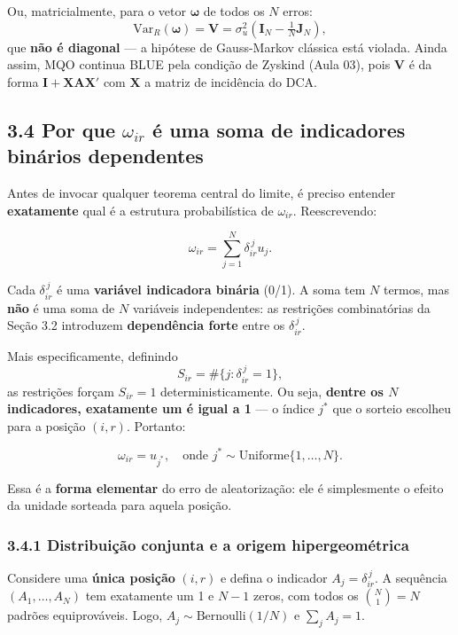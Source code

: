 \documentclass[
]{article}
\begin{document}
Ou, matricialmente, para o vetor \(\symbf{\omega}\) de todos os \(N\)
erros:
\[\mathrm{Var}_R(\symbf{\omega}) = \symbf{V} = \sigma_u^2\left(\symbf{I}_N - \tfrac{1}{N}\symbf{J}_N\right),\]
que \textbf{não é diagonal} --- a hipótese de Gauss-Markov clássica está
violada. Ainda assim, MQO continua BLUE pela condição de Zyskind (Aula
03), pois \(\symbf{V}\) é da forma
\(\symbf{I} + \symbf{X} \symbf{A} \symbf{X}'\) com \(\symbf{X}\) a
matriz de incidência do DCA.

\subsection{\texorpdfstring{3.4 Por que \(\omega_{ir}\) é uma soma de
indicadores binários
dependentes}{3.4 Por que \textbackslash omega\_\{ir\} é uma soma de indicadores binários dependentes}}\label{por-que-omega_ir-uxe9-uma-soma-de-indicadores-binuxe1rios-dependentes}

Antes de invocar qualquer teorema central do limite, é preciso entender
\textbf{exatamente} qual é a estrutura probabilística de
\(\omega_{ir}\). Reescrevendo:

\[\omega_{ir} = \sum_{j=1}^{N} \delta_{ir}^{\,j} u_j.\]

Cada \(\delta_{ir}^{\,j}\) é uma \textbf{variável indicadora binária}
(0/1). A soma tem \(N\) termos, mas \textbf{não} é uma soma de \(N\)
variáveis independentes: as restrições combinatórias da Seção 3.2
introduzem \textbf{dependência forte} entre os \(\delta_{ir}^{\,j}\).

Mais especificamente, definindo
\[S_{ir} = \#\{j : \delta_{ir}^{\,j} = 1\},\] as restrições forçam
\(S_{ir} = 1\) deterministicamente. Ou seja, \textbf{dentre os \(N\)
indicadores, exatamente um é igual a 1} --- o índice \(j^*\) que o
sorteio escolheu para a posição \((i,r)\). Portanto:

\[\omega_{ir} = u_{j^*}, \quad \text{onde } j^* \sim \mathrm{Uniforme}\{1,\dots,N\}.\]

Essa é a \textbf{forma elementar} do erro de aleatorização: ele é
simplesmente o efeito da unidade sorteada para aquela posição.

\subsubsection{3.4.1 Distribuição conjunta e a origem
hipergeométrica}\label{distribuiuxe7uxe3o-conjunta-e-a-origem-hipergeomuxe9trica}

Considere uma \textbf{única posição} \((i,r)\) e defina o indicador
\(A_j = \delta_{ir}^{\,j}\). A sequência \((A_1,\dots,A_N)\) tem
exatamente um 1 e \(N-1\) zeros, com todos os \(\binom{N}{1}=N\) padrões
equiprováveis. Logo, \(A_j \sim \mathrm{Bernoulli}(1/N)\) e
\(\sum_j A_j = 1\).
\end{document}
